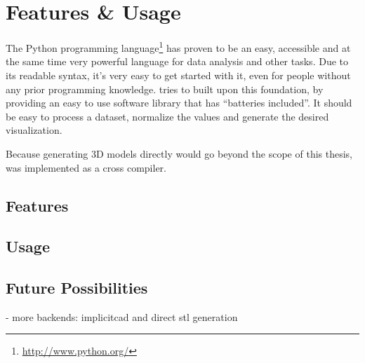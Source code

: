 
\chapter{Features {\&} Usage}

\label{ch:features}

The Python programming language\footnote{\url{http://www.python.org/}} has
proven to be an easy, accessible and at the same time very powerful language for
data analysis and other tasks. Due to its readable syntax, it's very easy to get
started with it, even for people without any prior programming knowledge.
\tangible{} tries to built upon this foundation, by providing an easy to use
software library that has ``batteries included''. It should be easy to process a
dataset, normalize the values and generate the desired visualization.

Because generating 3D models directly would go beyond the scope of this thesis,
\tangible{} was implemented as a cross compiler. 

\section{Features}\label{sec:features}


\section{Usage}\label{sec:usage}


\section{Future Possibilities}\label{sec:future}

- more backends: implicitcad and direct stl generation

